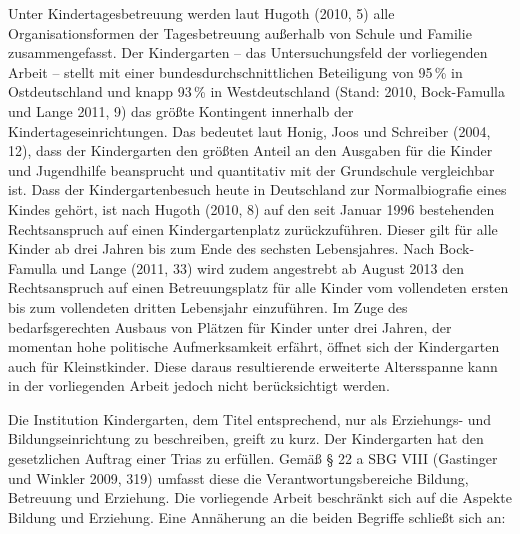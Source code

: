 Unter Kindertagesbetreuung werden laut Hugoth (2010, 5) alle Organisationsformen der Tagesbetreuung außerhalb von Schule und Familie zusammengefasst. Der Kindergarten -- das Untersuchungsfeld der vorliegenden Arbeit -- stellt mit einer bundesdurchschnitt\-lichen Beteiligung von 95\,\% in Ostdeutschland und knapp 93\,\% in Westdeutschland (Stand: 2010, Bock-Famulla und Lange 2011, 9) das größte Kontingent innerhalb der Kindertageseinrichtungen. Das bedeutet laut Honig, Joos  und Schreiber (2004, 12), dass der Kindergarten den größten Anteil an den Ausgaben für die Kinder und Jugendhilfe beansprucht und quantitativ mit der Grundschule vergleichbar ist. Dass der Kindergartenbesuch heute in Deutschland zur Normalbiografie eines Kindes gehört, ist nach Hugoth (2010, 8) auf den seit Januar 1996 bestehenden Rechtsanspruch auf einen Kindergartenplatz zurückzuführen. Dieser gilt für alle Kinder ab drei Jahren bis zum Ende des sechsten Lebensjahres. Nach Bock-Famulla und Lange (2011, 33) wird zudem angestrebt ab August 2013 den Rechtsanspruch auf einen Betreuungsplatz für alle Kinder vom vollendeten ersten bis zum vollendeten dritten Lebensjahr einzuführen. Im Zuge des bedarfsgerechten Ausbaus von Plätzen für Kinder unter drei Jahren, der momentan hohe politische Aufmerksamkeit erfährt, öffnet sich der Kindergarten auch für Kleinstkinder. Diese daraus resultierende erweiterte Altersspanne kann in der vorliegenden Arbeit jedoch nicht berücksichtigt werden.

Die Institution Kindergarten, dem Titel entsprechend, nur als Erziehungs- und Bildungseinrichtung zu beschreiben, greift zu kurz. Der Kindergarten hat den gesetzlichen Auftrag einer Trias zu erfüllen. Gemäß § 22 a SBG VIII (Gastinger und Winkler 2009, 319) umfasst diese die Verantwortungsbereiche Bildung, Betreuung und Erziehung. Die vorliegende Arbeit beschränkt sich auf die Aspekte Bildung und Erziehung. 
Eine Annäherung an die beiden Begriffe schließt sich an: 

